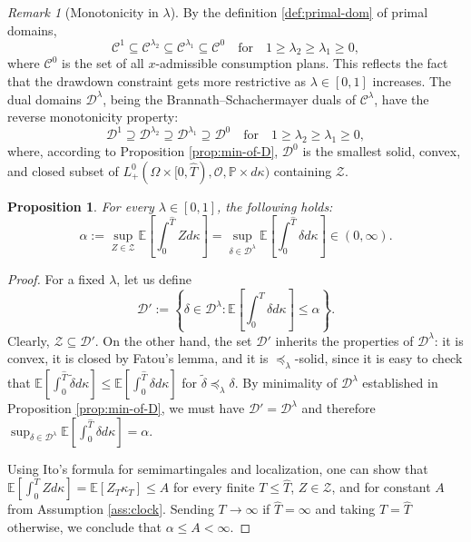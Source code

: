 \documentclass[11pt, oneside]{article}   	%
\theoremstyle{plain}
\newtheorem{prop}[thm]{Proposition}
\theoremstyle{definition}
\theoremstyle{remark}
\newtheorem{rem}[thm]{Remark}
\begin{document}
\begin{rem}[Monotonicity in $\lambda$]\label{rem:mon}
By the definition \eqref{def:primal-dom} of primal domains,
$$\mathcal{C}^1\subseteq\mathcal{C}^{\lambda_2}\subseteq\mathcal{C}^{\lambda_1}\subseteq\mathcal{C}^0\quad \text{for}\quad1\geq\lambda_2\geq\lambda_1\geq0,$$
where $\mathcal{C}^0$ is the set of all $x$-admissible consumption plans. This reflects the fact that the drawdown constraint gets more restrictive as $\lambda\in[0,1]$ increases.
The dual domains $\mathcal{D}^\lambda$, being the Brannath--Schachermayer duals of $\mathcal{C}^\lambda$, have the reverse monotonicity property:
$$\mathcal{D}^1\supseteq\mathcal{D}^{\lambda_2}\supseteq\mathcal{D}^{\lambda_1}\supseteq\mathcal{D}^0\quad \text{for}\quad1\geq\lambda_2\geq\lambda_1\geq0,$$
where, according to Proposition \ref{prop:min-of-D}, $\mathcal{D}^0$ is the smallest solid, convex, and closed subset of $L_+^0(\Omega\times[0,\hat{T}),\mathcal{O},\mathbb{P}\times d\kappa)$ containing $\mathcal{Z}$.
\end{rem}
\begin{prop}\label{prop:alpha-for-D}
For every $\lambda\in[0,1]$, the following holds:
\begin{equation*}
\alpha:=\sup_{Z\in\mathcal{Z}}\mathbb{E}\left[\int_0^{\hat{T}} Zd\kappa\right]=\sup_{\delta\in\mathcal{D}^\lambda}\mathbb{E}\left[\int_0^{\hat{T}}\delta d\kappa\right]\in(0,\infty).
\end{equation*}
\end{prop}
\begin{proof}
For a fixed $\lambda$, let us define
$$\mathcal{D}':=\left\{\delta\in\mathcal{D}^\lambda: \mathbb{E}\left[\int_0^{\hat{T}}\delta d\kappa\right]\leq \alpha\right\}.$$
Clearly, $\mathcal{Z}\subseteq\mathcal{D}'$. On the other hand, the set $\mathcal{D}'$ inherits the properties of $\mathcal{D}^\lambda$: it is convex, it is closed by Fatou's lemma, and it is $\preceq_\lambda$-solid, since it is easy to check that $\mathbb{E}\left[\int_0^{\hat{T}}\tilde\delta d\kappa\right]\leq\mathbb{E}\left[\int_0^{\hat{T}}\delta d\kappa\right]$ for $\tilde\delta\preceq_\lambda\delta$. By minimality of $\mathcal{D}^\lambda$ established in Proposition \ref{prop:min-of-D}, we must have $\mathcal{D}'=\mathcal{D}^\lambda$ and therefore $\sup_{\delta\in\mathcal{D}^\lambda}\mathbb{E}\left[\int_0^{\hat{T}} \delta d\kappa\right]=\alpha$.

Using Ito's formula for semimartingales and localization, one can show that $\mathbb{E}\left[\int_0^T Zd\kappa\right]=\mathbb{E}[Z_T\kappa_T]\leq A$ for every finite $T\leq\hat{T}$, $Z\in\mathcal{Z}$, and for constant $A$ from Assumption \ref{ass:clock}. Sending $T\to\infty$ if $\hat{T}=\infty$ and taking $T=\hat{T}$ otherwise, we conclude that $\alpha\leq A<\infty$.
\end{proof}
\end{document}

